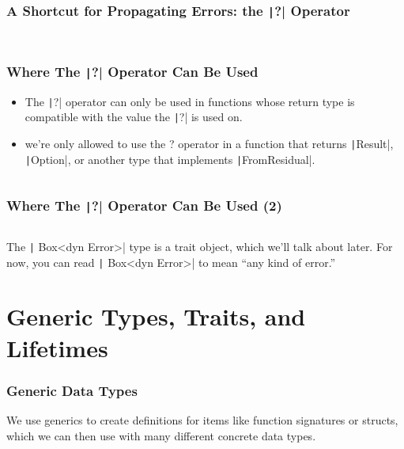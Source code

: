 \documentclass{beamer}
\begin{document}
\begin{frame}[fragile]
	\frametitle{A Shortcut for Propagating Errors: the \texttt|?| Operator}
	\inputminted[fontsize=\scriptsize]{rust}{./code/result9.rs}
	
	\inputminted[fontsize=\scriptsize]{rust}{./code/result10.rs}
\end{frame}

\begin{frame}[fragile]
	\frametitle{Where The \texttt|?| Operator Can Be Used}
	\begin{itemize}
		\item 	The \texttt|?| operator can only be used in functions whose return type is compatible with the value the \texttt|?| is used on.
		\item 	we’re only allowed to use the ? operator in a function that returns \texttt|Result|, \texttt|Option|, or another type that implements \texttt|FromResidual|.
	\end{itemize}
	
	\inputminted{rust}{./code/result11.rs}
\end{frame}

\begin{frame}[fragile]
	\frametitle{Where The \texttt|?| Operator Can Be Used (2)}
	\inputminted{rust}{./code/result12.rs}
	
	The \texttt| Box<dyn Error>| type is a trait object, which we’ll talk about later. For now, you can read \texttt| Box<dyn Error>|  to mean “any kind of error.” 
	
\end{frame}

\section{Generic Types, Traits, and Lifetimes}

\begin{frame}[fragile]
	\frametitle{Generic Data Types}
	We use generics to create definitions for items like function signatures or structs, which we can then use with many different concrete data types.
	
	\begin{columns}
		\inputminted{rust}{./code/generic1.rs}
		\inputminted{rust}{./code/generic2.rs}
	\end{columns}
\end{frame}
\end{document}
